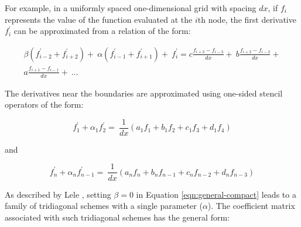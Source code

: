 



For example,
in a uniformly spaced one-dimensional grid with spacing $dx$,
if $f_i$ represents the value of
the function evaluated at the $i$th node,
the first derivative $f^{\prime}_i$ can be approximated from
a relation of the form:

\begin{equation}
\begin{split}
    \beta(f^{\prime}_{i-2} + f^{\prime}_{i+2}) + \
    \alpha(f^{\prime}_{i-1} + f^{\prime}_{i+1}) + \
        f^{\prime}_i
    = 
    c\frac{f_{i+3} - f_{i-3}}{dx} + \
    b\frac{f_{i+2} - f_{i-2}}{dx} + \\
    a\frac{f_{i+1} - f_{i-1}}{dx} + \
    \hdots
\end{split}
\label{eqn:general-compact}
\end{equation}

The derivatives near the boundaries are approximated using
one-sided stencil operators of the form:

\begin{equation}
f^{\prime}_1 + \alpha_1 f^{\prime}_2 = \
    \frac{1}{dx} (a_1 f_1 + b_1 f_2 + c_1 f_3 + d_1 f_4) 
\end{equation}

and 

\begin{equation}
    f^{\prime}_n + \alpha_n f^{\prime}_{n-1} = \
    \frac{1}{dx} (a_n f_n + b_n f_{n-1} + c_n f_{n-2} + d_n f_{n-3}) 
\end{equation}

As described by Lele \cite{lele1992compact},
setting $\beta = 0$ in Equation \ref{eqn:general-compact} leads to
a family of tridiagonal schemes with a single parameter ($\alpha$).
The coefficient matrix associated with such tridiagonal schemes
has the general form:

